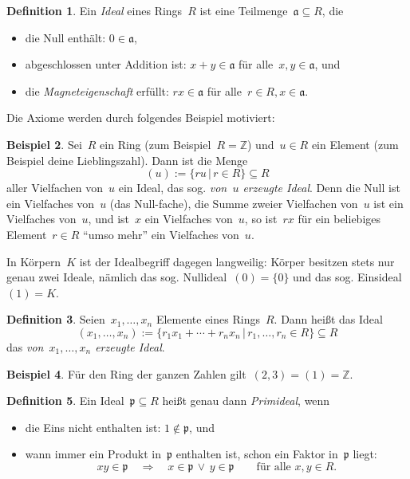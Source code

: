 \documentclass[a4paper,ngerman,12pt]{scrartcl}
\theoremstyle{definition}
\newtheorem{defn}{Definition}[section]
\newtheorem{bsp}[defn]{Beispiel}
\theoremstyle{plain}
\theoremstyle{remark}
\newcommand{\ZZ}{\mathbb{Z}}
\renewcommand{\aa}{\mathfrak{a}}
\newcommand{\pp}{\mathfrak{p}}
\renewcommand{\_}{\mathpunct{.}\,}
\newcommand{\?}{\,{:}\,}
\begin{document}
\begin{defn}Ein \emph{Ideal} eines Rings~$R$ ist eine Teilmenge~$\aa \subseteq R$, die
\begin{itemize}
\item die Null enthält: $0 \in \aa$,
\item abgeschlossen unter Addition ist: $x + y \in \aa$ für alle~$x,y \in \aa$, und
\item die \emph{Magneteigenschaft} erfüllt: $r x \in \aa$ für alle~$r \in R, x
\in \aa$.
\end{itemize}
\end{defn}

Die Axiome werden durch folgendes Beispiel motiviert:

\begin{bsp}Sei~$R$ ein Ring (zum Beispiel~$R = \ZZ$) und~$u \in R$ ein Element
(zum Beispiel deine Lieblingszahl). Dann ist die Menge
\[ (u) := \{ r u \,|\, r \in R \} \subseteq R \]
aller Vielfachen von~$u$ ein Ideal, das sog. \emph{von~$u$ erzeugte Ideal}.
Denn die Null ist ein Vielfaches von~$u$ (das Null-fache), die Summe zweier
Vielfachen von~$u$ ist ein Vielfaches von~$u$, und ist~$x$ ein Vielfaches
von~$u$, so ist~$r x$ für ein beliebiges Element~$r \in R$ "`umso mehr"' ein
Vielfaches von~$u$.
\end{bsp}

In Körpern~$K$ ist der Idealbegriff dagegen langweilig: Körper besitzen stets nur
genau zwei Ideale, nämlich das sog. Nullideal~$(0) = \{ 0 \}$ und das sog.
Einsideal~$(1) = K$.

\begin{defn}\label{def:idealerz}Seien~$x_1,\ldots,x_n$ Elemente eines
Rings~$R$. Dann heißt das Ideal
\[ (x_1,\ldots,x_n) := \{ r_1 x_1 + \cdots + r_n x_n \,|\, r_1,\ldots,r_n \in R
\} \subseteq R \]
das \emph{von~$x_1,\ldots,x_n$ erzeugte Ideal}.\end{defn}

\begin{bsp}Für den Ring der ganzen Zahlen gilt~$(2,3) = (1) = \ZZ$.\end{bsp}

\begin{defn}Ein Ideal~$\pp \subseteq R$ heißt genau dann \emph{Primideal}, wenn
\begin{itemize}
\item die Eins nicht enthalten ist: $1 \not\in \pp$, und
\item wann immer ein Produkt in~$\pp$ enthalten ist, schon ein Faktor in~$\pp$
liegt:
\[ xy \in \pp \quad\Longrightarrow\quad x \in \pp \,\vee\, y \in \pp
  \qquad\text{für alle~$x,y \in R$.} \]
\end{itemize}
\end{defn}
\end{document}

